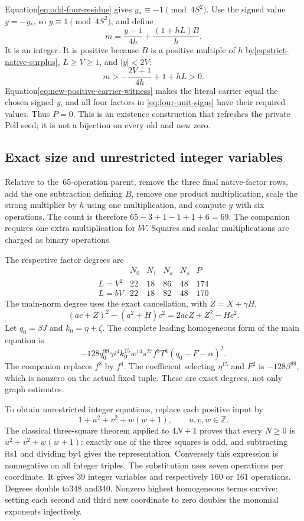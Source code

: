 Equation\eqref{eq:odd-four-residue} gives
$y_*\equiv-1\pmod{4S^2}$.  Use the signed value $y=-y_*$, so
$y\equiv1\pmod{4S^2}$, and define
\begin{equation}
 m=\frac{y-1}{4h}+\frac{(1+hL)B}{h}.
 \label{eq:new-positive-carrier-witness}
\end{equation}
It is an integer.  It is positive because $B$ is a positive multiple of
$h$ by\eqref{eq:strict-native-surplus}, $L\ge V\ge1$, and
$|y|<2V$:
\[
 m> -\frac{2V+1}{4h}+1+hL>0.
\]
Equation\eqref{eq:new-positive-carrier-witness} makes the literal
carrier equal the chosen signed $y$, and all four factors in
\eqref{eq:four-unit-signs} have their required values.  Thus $P=0$.
This is an existence construction that refreshes the private Pell seed;
it is not a bijection on every old and new zero.

\subsection{Exact size and unrestricted integer variables}

Relative to the~65-operation parent, remove the three final native-factor
rows, add the one subtraction defining $B$, remove one product
multiplication, scale the strong multiplier by $h$ using one multiplication,
and compute $y$ with six operations.  The count is therefore
$65-3+1-1+1+6=69$.  The companion requires one extra multiplication for
$bV$.  Squares and scalar multiplications are charged as binary operations.

The respective factor degrees are
\[
\begin{array}{c|rrrr|r}
 &N_0&N_1&N_a&N_s&P\\\hline
L=V^2&22&18&86&48&174\\
L=bV&22&18&82&48&170
\end{array}
\]
The main-norm degree uses the exact cancellation, with $Z=X+\gamma H$,
\[
 (ac+Z)^2-(a^2+H)c^2=2acZ+Z^2-Hc^2.
\]
Let $q_0=\beta J$ and $k_0=\eta+\zeta$.  The complete leading
homogeneous form of the main equation is
\[
 -128q_0^{99}\gamma i^4k_0^{15}w^{14}s^{27}f^8T^4
          (q_0-F-\alpha)^2.
\]
The companion replaces $f^8$ by $f^4$.  The coefficient selecting
$\eta^{15}$ and $F^2$ is $-128\beta^{99}$, which is nonzero on the
actual fixed tuple.  These are exact degrees, not only graph estimates.

To obtain unrestricted integer equations, replace each positive input by
\[
 1+u^2+v^2+w(w+1),\qquad u,v,w\in\mathbb Z.
\]
The classical three-square theorem applied to $4N+1$ proves that every
$N\ge0$ is $u^2+v^2+w(w+1)$: exactly one of the three squares is odd,
and subtracting its1 and dividing by4 gives the representation.
Conversely this expression is nonnegative on all integer triples.
The substitution uses seven operations per coordinate.  It gives
$39$ integer variables and respectively $160$ or $161$ operations.
Degrees double to348 and340.  Nonzero highest homogeneous terms survive:
setting each second and third new coordinate to zero doubles the
monomial exponents injectively.

